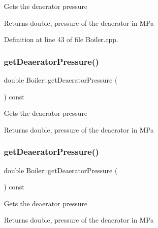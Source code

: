 Gets the deaerator pressure \begin{DoxyReturn}{Returns}
double, pressure of the deaerator in M\+Pa 
\end{DoxyReturn}


Definition at line 43 of file Boiler.\+cpp.

\mbox{\label{class_boiler_aad4786e7b68084e65a35dd6235517b8c}} 
\subsubsection{\texorpdfstring{get\+Deaerator\+Pressure()}{getDeaeratorPressure()}\hspace{0.1cm}{\footnotesize\ttfamily [2/3]}}
{\footnotesize\ttfamily double Boiler\+::get\+Deaerator\+Pressure (\begin{DoxyParamCaption}{ }\end{DoxyParamCaption}) const}

Gets the deaerator pressure \begin{DoxyReturn}{Returns}
double, pressure of the deaerator in M\+Pa 
\end{DoxyReturn}
\mbox{\label{class_boiler_aad4786e7b68084e65a35dd6235517b8c}} 
\subsubsection{\texorpdfstring{get\+Deaerator\+Pressure()}{getDeaeratorPressure()}\hspace{0.1cm}{\footnotesize\ttfamily [3/3]}}
{\footnotesize\ttfamily double Boiler\+::get\+Deaerator\+Pressure (\begin{DoxyParamCaption}{ }\end{DoxyParamCaption}) const}

Gets the deaerator pressure \begin{DoxyReturn}{Returns}
double, pressure of the deaerator in M\+Pa 
\end{DoxyReturn}
\mbox{\label{class_boiler_a55542a761669c842163b20932f9747d3}} 
